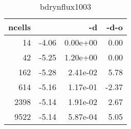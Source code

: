 \documentclass[11pt]{article}
\begin{document}
%
%
\begin{table}[!htbp]
\begin{center}
\begin{tabular}{r||r|r|r}
ncells           &                  & -d               & -d-o            \\\hline\hline
             14&     -4.06&  0.00e+00&    0.00\\\hline
             42&     -5.25&  1.20e+00&    0.00\\\hline
            162&     -5.28&  2.41e-02&    5.78\\\hline
            614&     -5.16&  1.17e-01&   -2.37\\\hline
           2398&     -5.14&  1.91e-02&    2.67\\\hline
           9522&     -5.14&  5.87e-04&    5.05\\\hline
\end{tabular}
\caption{bdrynflux1003}
\end{center}
\label{tab:bdrynflux1003}
\end{table}
%
%

\end{document}
